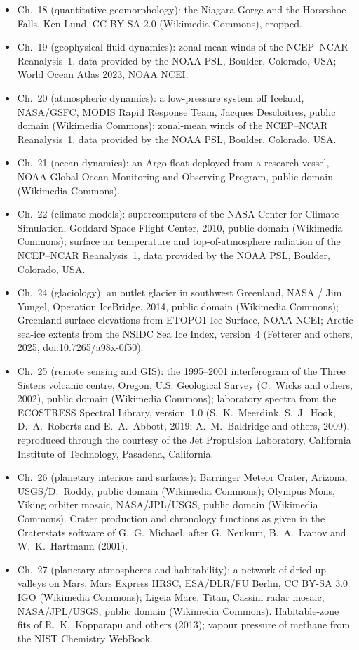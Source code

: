 \begin{itemize}
  \item Ch.~18 (quantitative geomorphology): the Niagara Gorge and the Horseshoe Falls, Ken Lund, CC BY-SA 2.0 (Wikimedia Commons), cropped.
  \item Ch.~19 (geophysical fluid dynamics): zonal-mean winds of the NCEP--NCAR Reanalysis~1, data provided by the NOAA PSL, Boulder, Colorado, USA; World Ocean Atlas 2023, NOAA NCEI.
  \item Ch.~20 (atmospheric dynamics): a low-pressure system off Iceland, NASA/GSFC, MODIS Rapid Response Team, Jacques Descloitres, public domain (Wikimedia Commons); zonal-mean winds of the NCEP--NCAR Reanalysis~1, data provided by the NOAA PSL, Boulder, Colorado, USA.
  \item Ch.~21 (ocean dynamics): an Argo float deployed from a research vessel, NOAA Global Ocean Monitoring and Observing Program, public domain (Wikimedia Commons).
  \item Ch.~22 (climate models): supercomputers of the NASA Center for Climate Simulation, Goddard Space Flight Center, 2010, public domain (Wikimedia Commons); surface air temperature and top-of-atmosphere radiation of the NCEP--NCAR Reanalysis~1, data provided by the NOAA PSL, Boulder, Colorado, USA.
  \item Ch.~24 (glaciology): an outlet glacier in southwest Greenland, NASA / Jim Yungel, Operation IceBridge, 2014, public domain (Wikimedia Commons); Greenland surface elevations from ETOPO1 Ice Surface, NOAA NCEI; Arctic sea-ice extents from the NSIDC Sea Ice Index, version~4 (Fetterer and others, 2025, doi:10.7265/a98x-0f50).
  \item Ch.~25 (remote sensing and GIS): the 1995--2001 interferogram of the Three Sisters volcanic centre, Oregon, U.S. Geological Survey (C.~Wicks and others, 2002), public domain (Wikimedia Commons); laboratory spectra from the ECOSTRESS Spectral Library, version~1.0 (S.~K.~Meerdink, S.~J.~Hook, D.~A.~Roberts and E.~A.~Abbott, 2019; A.~M.~Baldridge and others, 2009), reproduced through the courtesy of the Jet Propulsion Laboratory, California Institute of Technology, Pasadena, California.
  \item Ch.~26 (planetary interiors and surfaces): Barringer Meteor Crater, Arizona, USGS/D.~Roddy, public domain (Wikimedia Commons); Olympus Mons, Viking orbiter mosaic, NASA/JPL/USGS, public domain (Wikimedia Commons). Crater production and chronology functions as given in the Craterstats software of G.~G.~Michael, after G.~Neukum, B.~A.~Ivanov and W.~K.~Hartmann (2001).
  \item Ch.~27 (planetary atmospheres and habitability): a network of dried-up valleys on Mars, Mars Express HRSC, ESA/DLR/FU Berlin, CC BY-SA 3.0 IGO (Wikimedia Commons); Ligeia Mare, Titan, Cassini radar mosaic, NASA/JPL/USGS, public domain (Wikimedia Commons). Habitable-zone fits of R.~K.~Kopparapu and others (2013); vapour pressure of methane from the NIST Chemistry WebBook.

\end{itemize}

